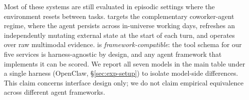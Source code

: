 Most of these systems are still evaluated in episodic settings where the environment resets between tasks. \bench{} targets the complementary coworker-agent regime, where the agent persists across in-universe working days, refreshes an independently mutating external state at the start of each turn, and operates over raw multimodal evidence. \bench{} is \emph{framework-compatible}: the tool schema for our five services is harness-agnostic by design, and any agent framework that implements it can be scored. We report all seven models in the main table under a single harness (OpenClaw, \S\ref{sec:exp-setup}) to isolate model-side differences. This claim concerns interface design only; we do not claim empirical equivalence across different agent frameworks.
